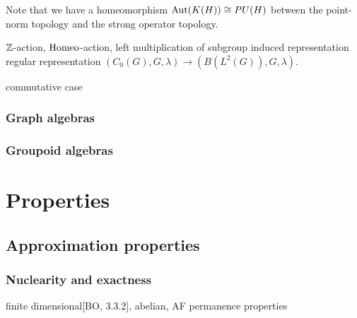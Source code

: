\documentclass{../../large}
\begin{document}
Note that we have a homeomorphism $\operatorname{Aut}(K(H))\cong PU(H)$ between the point-norm topology and the strong operator topology.

$\mathbb{Z}$-action, $\operatorname{Homeo}$-action, left multiplication of subgroup
induced representation
regular representation $(C_0(G),G,\lambda)\to(B(L^2(G)),G,\lambda)$.


commutative case




\section{Graph algebras}






\section{Groupoid algebras}









\part{Properties}
\chapter{Approximation properties}
\section{Nuclearity and exactness}

finite dimensional[BO, 3.3.2], abelian, AF
permanence properties
\end{document}
